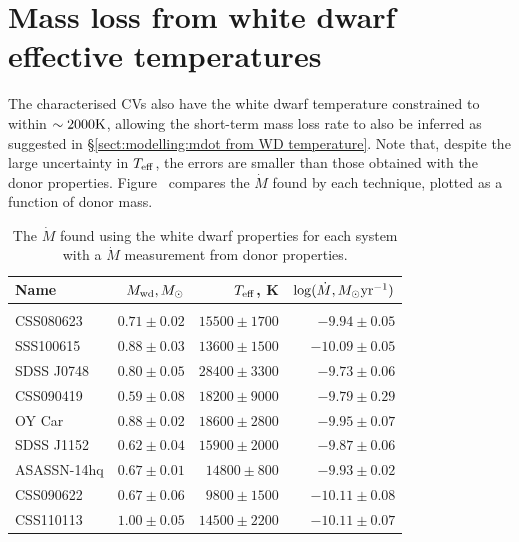 \section{Mass loss from white dwarf effective temperatures}
\label{sect:modelling:white dwarf mass loss rates}

The characterised CVs also have the white dwarf temperature constrained to within $\sim 2000 \rm K$, allowing the short-term mass loss rate to also be inferred as suggested in \S\ref{sect:modelling:mdot from WD temperature}.
Note that, despite the large uncertainty in $T_{\rm eff}$, the errors are smaller than those obtained with the donor properties. Figure~ compares the $\dot M$ found by each technique, plotted as a function of donor mass.

\begin{table}
    \centering
    \caption{The $\dot M$ found using the white dwarf properties for each system with a $\dot M$ measurement from donor properties.}
    \label{table:results:Mdot from white dwarf parameters}
    \begin{tabular}{lrrr}
        \hline
        \textbf{Name} & \textbf{$M_{\rm wd}, M_\odot$} & \textbf{$T_{\rm eff}$, K} & \textbf{$\log (\dot M, M_\odot {\rm yr}^{-1})$} \\
        \hline \hline \\
        CSS080623       & $0.71 \pm 0.02$       & $15500 \pm 1700$      & $ -9.94 \pm 0.05$ \\
        SSS100615       & $0.88 \pm 0.03$       & $13600 \pm 1500$      & $-10.09 \pm 0.05$ \\
        SDSS J0748      & $0.80 \pm 0.05$       & $28400 \pm 3300$      & $ -9.73 \pm 0.06$ \\
        CSS090419       & $0.59 \pm 0.08$       & $18200 \pm 9000$      & $ -9.79 \pm 0.29$ \\
        OY Car          & $0.88 \pm 0.02$       & $18600 \pm 2800$      & $ -9.95 \pm 0.07$ \\
        SDSS J1152      & $0.62 \pm 0.04$       & $15900 \pm 2000$      & $ -9.87 \pm 0.06$ \\
        ASASSN-14hq     & $0.67 \pm 0.01$       & $14800 \pm  800$      & $ -9.93 \pm 0.02$ \\
        CSS090622       & $0.67 \pm 0.06$       & $ 9800 \pm 1500$      & $-10.11 \pm 0.08$ \\
        CSS110113       & $1.00 \pm 0.05$       & $14500 \pm 2200$      & $-10.11 \pm 0.07$ \\

\end{tabular}
\end{table}
